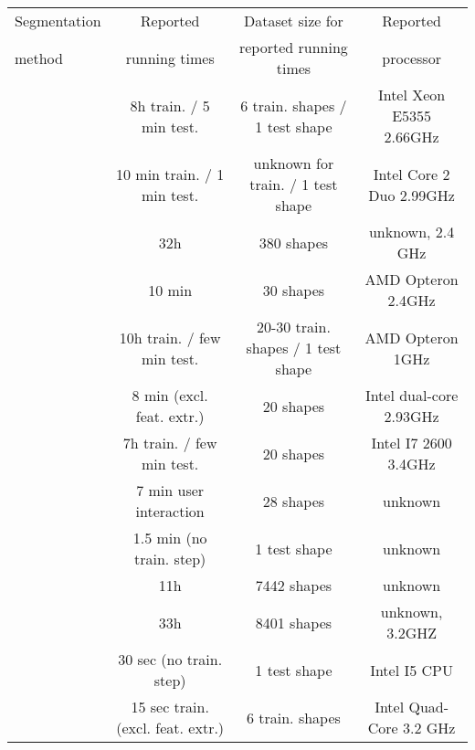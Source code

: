 \begin{table*}[t!]
\small
  \centering
    \begin{tabular}{l|c|c|c}
    \hline
    Segmentation                & Reported                     &  Dataset size for       & Reported \\
    method                      & running times                &  reported running times & processor \\
    \hline
    \hline
    \cite{Kalogerakis:2010:LMS} & 8h train. / 5 min test.      &  6 train. shapes / 1 test shape     & Intel Xeon E5355 2.66GHz \\
    \hline
    \cite{Benhabiles:2011:LBE}  & 10 min train. / 1 min test.  &  unknown for train. / 1 test shape  & Intel Core 2 Duo 2.99GHz \\
    \hline
    \cite{Huang:2011:JSS}       & 32h                          &  380 shapes                         & unknown, 2.4 GHz \\
    \hline
    \cite{Sidi:2011:CS}         & 10 min                       &  30 shapes                          & AMD Opteron 2.4GHz \\
    \hline
    \cite{van-Kaick:2011:PKC}   & 10h train. / few min test.   &  20-30 train. shapes / 1 test shape & AMD Opteron 1GHz  \\
    \hline
    \cite{Hu:2012:CSS}          & 8 min (excl. feat. extr.)    &  20 shapes                          & Intel dual-core 2.93GHz  \\
    \hline
    \cite{Lv:2012:SMS}          & 7h train. / few min test.    &  20 shapes                          & Intel I7 2600 3.4GHz \\
    \hline
    \cite{Wang:2012:ACS}        & 7 min user interaction       &  28 shapes                          & unknown \\
    \hline
    \cite{Wang:2013:PAS}        & 1.5 min (no train. step)     &  1 test shape                       & unknown \\
    \hline
    \cite{Kim:2013:lpt}         & 11h                          &  7442 shapes                        & unknown \\
    \hline
    \cite{Huang:2014:FMN}       & 33h                          &  8401 shapes                        & unknown, 3.2GHZ \\
    \hline
    \cite{Xu:2014:TSS}          & 30 sec (no train. step)      &  1 test shape                       & Intel I5 CPU \\
    \hline
    \cite{Zhige:2014:SSL}       & 15 sec train. (excl. feat. extr.) &  6 train. shapes                & Intel Quad-Core 3.2 GHz \\

\end{tabular}
\end{table*}
